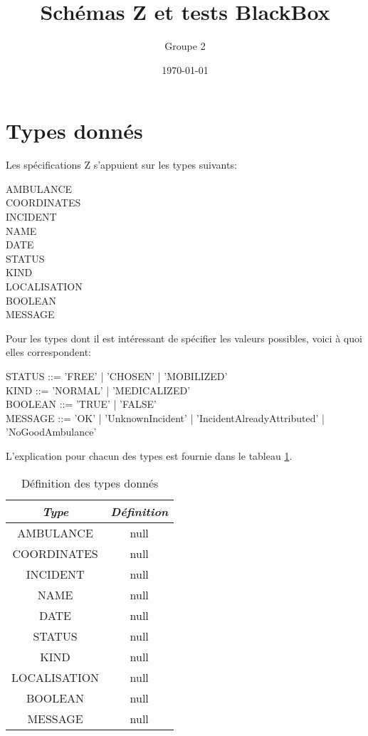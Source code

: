 \documentclass[12pt]{article}
\begin{document}
\title{Schémas Z et tests BlackBox}
\author{Groupe 2}
\date{\today}
\maketitle


\section{Types donnés}
Les spécifications Z s'appuient sur les types suivants:
\begin{zed}
AMBULANCE \\
COORDINATES \\
INCIDENT \\
NAME \\
DATE \\
STATUS  \\
KIND \\
LOCALISATION \\
BOOLEAN \\
MESSAGE  \\
\end{zed}

Pour les types dont il est intéressant de spécifier les valeurs possibles, voici à quoi elles correspondent:
\begin{syntax}
STATUS ::= 'FREE' | 'CHOSEN' | 'MOBILIZED' \\
KIND ::= 'NORMAL' | 'MEDICALIZED' \\
BOOLEAN ::= 'TRUE'  | 'FALSE' \\
MESSAGE ::= 'OK' | 'UnknownIncident' | 'IncidentAlreadyAttributed' | 'NoGoodAmbulance'\\ %
\end{syntax}

L'explication pour chacun des types est fournie dans le tableau \ref{tab:typedefinition}.
\begin{table}[htdp]
\begin{center}\begin{tabular}{|c|c|}\hline 
\textit{Type} & \textit{Définition} \\\hline
AMBULANCE & null \\\hline COORDINATES & null \\\hline INCIDENT & null \\\hline NAME & null \\\hline DATE & null \\\hline STATUS & null \\\hline KIND & null \\\hline LOCALISATION & null \\\hline BOOLEAN & null \\\hline MESSAGE & null \\\hline \end{tabular} \caption{Définition des types donnés}
\end{center}
\label{tab:typedefinition}
\end{table}
\end{document}
